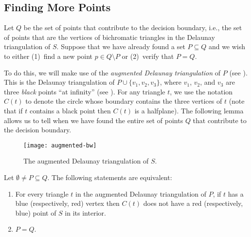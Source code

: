 \documentclass[lotsofwhite,charterfonts]{patmorin}
\begin{document}
\subsection{Finding More Points}

Let $Q$ be the set of points that contribute to the decision
boundary, i.e., the set of points that are the vertices of bichromatic
triangles in the Delaunay triangulation of $S$.  Suppose that we have
already found a set $P\subseteq Q$ and we wish to either (1)~find a
new point $p\in Q\setminus P$ or (2)~verify that $P=Q$.  

To do this, we will make use of the \emph{augmented Delaunay
triangulation} of $P$ (see ).  This is the
Delaunay triangulation of $P\cup \{v_1,v_2,v_3\}$, where $v_1$,
$v_2$, and $v_3$ are three \emph{black} points ``at infinity'' (see
). For any triangle $t$, we use the notation $C(t)$
to denote the circle whose boundary contains the three vertices of $t$
(note that if $t$ contains a black point then $C(t)$ is a halfplane).
The following lemma allows us to tell when we have found the entire
set of points $Q$ that contribute to the decision boundary.

\begin{figure}
\centerline{\texttt{[image: augmented-bw]}}
\caption{The augmented Delaunay triangulation of
$S$.}
\end{figure}


\begin{lem} 
Let $\emptyset\neq P\subseteq Q$.  The following statements are equivalent:
\begin{enumerate}

\item For every triangle $t$ in the augmented Delaunay triangulation
of $P$, if $t$ has a blue (respectively, red) vertex then $C(t)$
does not have a red (respectively, blue) point of $S$ in its
interior.  

\item $P=Q$.
\end{enumerate}
\end{lem}
\end{document}
